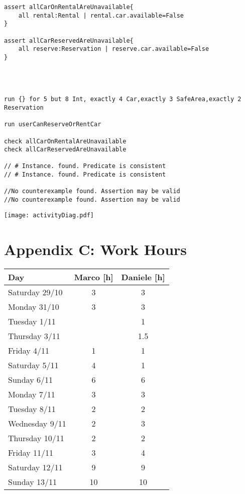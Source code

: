 \documentclass{scrreprt}
\begin{document}
\begin{verbatim}
assert allCarOnRentalAreUnavailable{
	all rental:Rental | rental.car.available=False
}

assert allCarReservedAreUnavailable{
	all reserve:Reservation | reserve.car.available=False
}




run {} for 5 but 8 Int, exactly 4 Car,exactly 3 SafeArea,exactly 2 Reservation

run userCanReserveOrRentCar

check allCarOnRentalAreUnavailable
check allCarReservedAreUnavailable

// # Instance. found. Predicate is consistent
// # Instance. found. Predicate is consistent

//No counterexample found. Assertion may be valid
//No counterexample found. Assertion may be valid

\end{verbatim}

\begin{center}
\texttt{[image: activityDiag.pdf]}
\end{center}

\section{Appendix C: Work Hours}
\begin{center}
    \begin{tabular}{lcc}
        \toprule
	   \textbf{ Day }& \textbf{ Marco [h]  }& \textbf{ Daniele [h] }\\
        \midrule
		Saturday 29/10 & 3 & 3\\
		Monday 31/10 & 3 & 3\\
		Tuesday 1/11 & & 1\\
		Thursday 3/11 & &1.5\\
		Friday 4/11 & 1 & 1\\
		Saturday 5/11 & 4 & 1\\
		Sunday 6/11 & 6 & 6\\
		Monday 7/11 & 3 & 3\\
		Tuesday 8/11 & 2 & 2\\
		Wednesday 9/11 &2 &3\\
		Thursday 10/11 & 2 & 2\\
		Friday 11/11 & 3 & 4\\
		Saturday 12/11 & 9 & 9\\
		Sunday 13/11 & 10 & 10\\
	\bottomrule
    \end{tabular}
\end{center}

\begin{comment}
\section{Appendix C: To Be Determined List}
\begin{comment}$<$Collect a numbered list of the TBD (to be determined) references that remain 
in the SRS so they can be tracked to closure.$>$
\end{comment}
\end{document}
